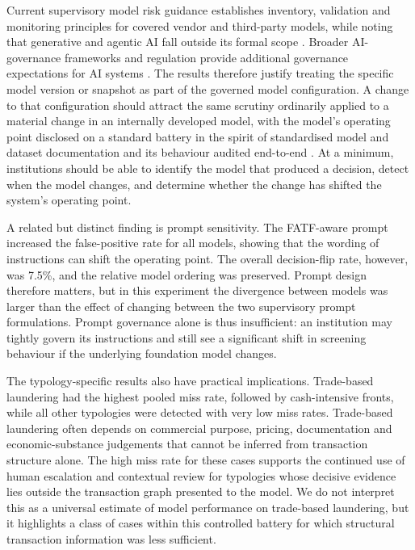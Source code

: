 \documentclass[pdflatex,sn-basic,Numbered]{sn-jnl}
\begin{document}
Current supervisory model risk guidance establishes inventory, validation and monitoring principles for covered vendor and third-party models, while noting that generative and agentic AI fall outside its formal scope \cite{srguidance}. Broader AI-governance frameworks and regulation provide additional governance expectations for AI systems \cite{aiact,nistrmf}. The results therefore justify treating the specific model version or snapshot as part of the governed model configuration. A change to that configuration should attract the same scrutiny ordinarily applied to a material change in an internally developed model, with the model's operating point disclosed on a standard battery in the spirit of standardised model and dataset documentation \cite{modelcards,datasheets} and its behaviour audited end-to-end \cite{accountability}. At a minimum, institutions should be able to identify the model that produced a decision, detect when the model changes, and determine whether the change has shifted the system's operating point.

A related but distinct finding is prompt sensitivity. The FATF-aware prompt increased the false-positive rate for all models, showing that the wording of instructions can shift the operating point. The overall decision-flip rate, however, was 7.5\%, and the relative model ordering was preserved. Prompt design therefore matters, but in this experiment the divergence between models was larger than the effect of changing between the two supervisory prompt formulations. Prompt governance alone is thus insufficient: an institution may tightly govern its instructions and still see a significant shift in screening behaviour if the underlying foundation model changes.

The typology-specific results also have practical implications. Trade-based laundering had the highest pooled miss rate, followed by cash-intensive fronts, while all other typologies were detected with very low miss rates. Trade-based laundering often depends on commercial purpose, pricing, documentation and economic-substance judgements that cannot be inferred from transaction structure alone. The high miss rate for these cases supports the continued use of human escalation and contextual review for typologies whose decisive evidence lies outside the transaction graph presented to the model. We do not interpret this as a universal estimate of model performance on trade-based laundering, but it highlights a class of cases within this controlled battery for which structural transaction information was less sufficient.
\end{document}

